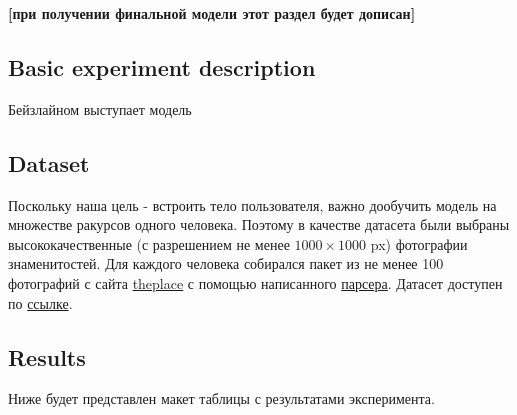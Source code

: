 \documentclass[a4paper,14pt]{article}
\theoremstyle{plain} %
\theoremstyle{definition} %
\theoremstyle{remark} %
\begin{document}
		\textbf{[при получении финальной модели этот раздел будет дописан]}

	\subsection{Basic experiment description}
		Бейзлайном выступает модель

	\subsection{Dataset}
		Поскольку наша цель - встроить тело пользователя, важно дообучить модель на множестве ракурсов одного человека.
		Поэтому в качестве датасета были выбраны высококачественные (с разрешением не менее $1000\times 1000$ px) фотографии знаменитостей. Для каждого человека собирался пакет из
		не менее 100 фотографий с сайта \href{https://www.theplace.ru/photos/}{theplace} с помощью написанного \href{https://github.com/wolkendolf/2025-project-DiffModels/tree/main/parser}{парсера}.
		Датасет доступен по \href{https://drive.google.com/drive/folders/1gP83US8DSw-OM0Fc1MlOYFVd0QJ7oJmy?usp=sharing}{ссылке}.

	\subsection{Results}
		Ниже будет представлен макет таблицы с результатами эксперимента.


	\nocite{*}
		
\end{document}
